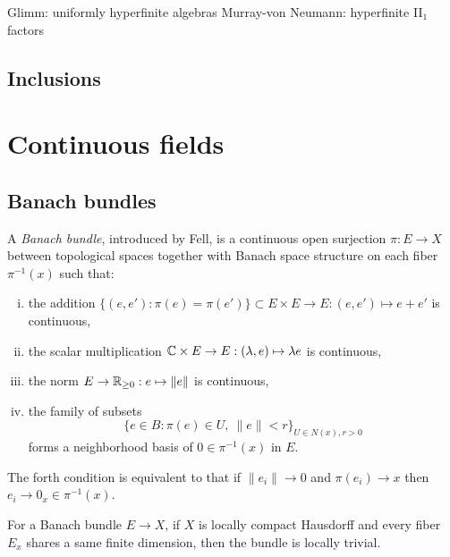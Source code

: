 \documentclass{../../large}
\begin{document}
Glimm: uniformly hyperfinite algebras
Murray-von Neumann: hyperfinite II$_1$ factors




\section{Inclusions}










\chapter{Continuous fields}


\section{Banach bundles}

\begin{prb}
A \emph{Banach bundle}, introduced by Fell, is a continuous open surjection $\pi:E\to X$ between topological spaces together with Banach space structure on each fiber $\pi^{-1}(x)$ such that:
\begin{enumerate}[(i)]
\item the addition $\{(e,e'):\pi(e)=\pi(e')\}\subset E\times E\to E:(e,e')\mapsto e+e'$ is continuous,
\item the scalar multiplication $\mathbb{C}\times E\to E:(\lambda,e)\mapsto\lambda e$ is continuous,
\item the norm $E\to\mathbb{R}_{\ge0}:e\mapsto\|e\|$ is continuous,
\item the family of subsets
\[\{e\in B:\pi(e)\in U,\ \|e\|<r\}_{U\in N(x),r>0}\]
forms a neighborhood basis of $0\in\pi^{-1}(x)$ in $E$.
\end{enumerate}
The forth condition is equivalent to that if $\|e_i\|\to0$ and $\pi(e_i)\to x$ then $e_i\to 0_x\in\pi^{-1}(x)$.
\begin{parts}
\item For a Banach bundle $E\to X$, if $X$ is locally compact Hausdorff and every fiber $E_x$ shares a same finite dimension, then the bundle is locally trivial.
\end{parts}
\end{prb}


\begin{prb}
\end{prb}
\end{document}
